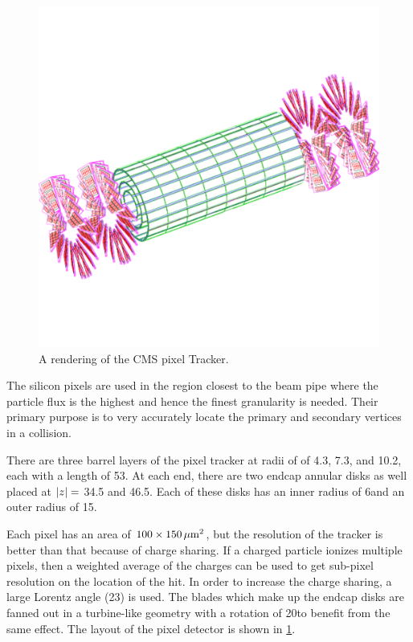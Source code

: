 \begin{figure}[!htbp]
    \centering
    \includegraphics[width=\textwidth]{figures/pixel_layout.pdf}
    \caption{
        A rendering of the CMS pixel Tracker.
    }
    \label{fig:pixel_layout}
\end{figure}

The silicon pixels are used in the region closest to the beam pipe where the
particle flux is the highest and hence the finest granularity is needed. Their
primary purpose is to very accurately locate the primary and secondary vertices
in a collision.

There are three barrel layers of the pixel tracker at radii of of 4.3, 7.3, and
10.2\centimeters, each with a length of 53\centimeters. At each end, there are
two endcap annular disks as well placed at $|z|=$ 34.5 and
46.5\centimeters. Each of these disks has an inner radius of 6\centimeters and
an outer radius of 15\centimeters.

Each pixel has an area of $100 \times 150 \text{\,$\mu$m}^{2}$, but the resolution
of the tracker is better than that because of charge sharing. If a charged
particle ionizes multiple pixels, then a weighted average of the charges can be
used to get sub-pixel resolution on the location of the hit. In order to
increase the charge sharing, a large Lorentz angle (23\degrees) is used. The
blades which make up the endcap disks are fanned out in a turbine-like geometry
with a rotation of 20\degrees to benefit from the same effect. The layout of
the pixel detector is shown in \cref{fig:pixel_layout}.

